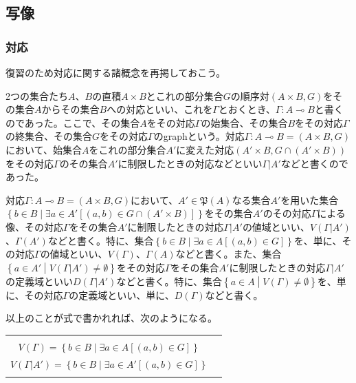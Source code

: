 \documentclass[dvipdfmx]{jsarticle}
\begin{document}
\subsection{写像}%
\subsubsection{対応}%
復習のため対応に関する諸概念を再掲しておこう。\par
2つの集合たち$A$、$B$の直積$A \times B$とこれの部分集合$G$の順序対$(A \times B,G)$をその集合$A$からその集合$B$への対応といい、これを$\varGamma$とおくとき、$\varGamma:A \multimap B$と書くのであった。ここで、その集合$A$をその対応$\varGamma$の始集合、その集合$B$をその対応$\varGamma$の終集合、その集合$G$をその対応$\varGamma$のgraphという。対応$\varGamma:A \multimap B = (A \times B,G)$において、始集合$A$をこれの部分集合$A'$に変えた対応$\left( A' \times B,G \cap \left( A' \times B \right) \right)$をその対応$\varGamma$のその集合$A'$に制限したときの対応などといい$\varGamma|A'$などと書くのであった。\par
対応$\varGamma:A \multimap B = (A \times B,G)$において、$A'\in \mathfrak{P}(A)$なる集合$A'$を用いた集合$\left\{ b \in B \middle| \exists a \in A'\left[ (a,b) \in G \cap \left( A' \times B \right) \right] \right\}$をその集合$A'$のその対応$\varGamma$による像、その対応$\varGamma$をその集合$A'$に制限したときの対応$\varGamma|A'$の値域といい、$V\left( \varGamma|A' \right)$、$\varGamma\left( A' \right)$などと書く。特に、集合$\left\{ b \in B \middle| \exists a \in A\left[ (a,b) \in G \right] \right\}$を、単に、その対応$\varGamma$の値域といい、$V(\varGamma)$、$\varGamma(A)$などと書く。また、集合$\left\{ a \in A' \middle| V\left( \varGamma|A' \right) \neq \emptyset \right\}$をその対応$\varGamma$をその集合$A'$に制限したときの対応$\varGamma|A'$の定義域といい$D\left( \varGamma|A' \right)$などと書く。特に、集合$\left\{ a \in A \middle| V(\varGamma) \neq \emptyset \right\}$を、単に、その対応$\varGamma$の定義域といい、単に、$D(\varGamma)$などと書く。\par
以上のことが式で書かれれば、次のようになる。
\begin{longtable}[c]{cc}
\hspace{-0.5em}\begin{tabular}{l}
  $D(\varGamma) = \left\{ a \in A \middle| V(\varGamma) \neq \emptyset \right\} $\\
  $V(\varGamma) = \left\{ b \in B \middle| \exists a \in A\left[ (a,b) \in G \right] \right\} $
\end{tabular} & \hspace{-0.5em}\begin{tabular}{l}
  $D\left( \varGamma|A' \right) = \left\{ a \in A \middle| V\left( \varGamma|A' \right) \neq \emptyset \right\} $ \\
  $V\left( \varGamma|A' \right) = \left\{ b \in B \middle| \exists a \in A'\left[ (a,b) \in G \right] \right\} $ \\
\end{tabular} \\
\end{longtable}
\end{document}
